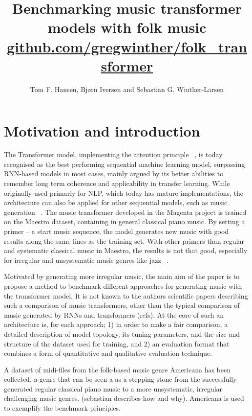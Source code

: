 \documentclass{article}
\title{Benchmarking music transformer models with folk music \\
    \normalsize{\url{github.com/gregwinther/folk_transformer}}}
\author{Tom F. Hansen, Bjørn Iversen and Sebastian G. Winther-Larsen}
\begin{document}
    \maketitle

    \section{Motivation and introduction}

        The Transformer model, implementing the attention principle ~\cite{vaswani2017attention}, is today recognised as the best performing sequential machine learning model, surpassing RNN-based models in most cases, mainly argued by its better abilities to remember long term coherence and applicability in transfer learning. While originally used primarly for NLP, which today has mature implementations, the architecture can also be applied for other sequential models, such as music generation ~\cite{huang2018music}. The music transformer developed in the Magenta project is trained on the Maestro dataset, containing in general classical piano music. By setting a primer – a start music sequence, the model generates new music with good results along the same lines as the training set. With other primers than regular and systematic classical music in Maestro, the results is not that good, especially for irregular and unsystematic music genres like jazz ~\cite{wu2020jazz}.
        
        Motivated by generating more irregular music, the main aim of the paper is to propose a method to benchmark different approaches for generating music with the transformer model. It is not known to the authors scientific papers describing such a comparison of music transformers, other than the typical comparison of music generated by RNNs and transformers (refs). At the core of such an architecture is, for each approach; 1) in order to make a fair comparison, a detailed description of model topology, its tuning parameters, and the size and structure of the dataset used for training, and 2) an evaluation format that combines a form of quantitative and qualitative evaluation technique.
        
        A dataset of midi-files from the folk-based music genre Americana has been collected, a genre that can be seen a as a stepping stone from the successfully generated regular classical piano music to a more unsystematic, irregular challenging music genres. (sebastian describes how and why). Americana is used to exemplify the benchmark principles.
\end{document}
